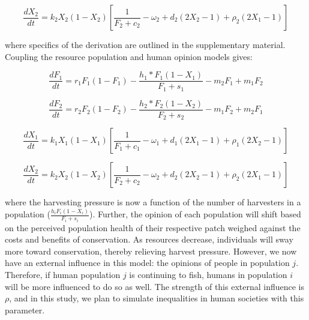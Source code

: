 \documentclass[
  12pt,
]{article}
\begin{document}
\begin{equation} 
\frac{dX_2}{dt} = k_2X_2(1-X_2)  [\frac{1}{F_2+c_2} - \omega_2 + d_2(2X_2 - 1) +  \rho_2(2X_1 - 1)]
  \label{eq:social2}
\end{equation}

where specifics of the derivation are outlined in the supplementary material. Coupling the resource population and human opinion models gives:

\begin{equation}
\frac{dF_1}{dt} = r_1F_1(1-F_1)-\frac{h_1*F_1(1-X_1)}{F_1 + s_1} -m_2F_1 + m_1F_2
  \label{eq:FishWhole1}
\end{equation}

\begin{equation}
\frac{dF_2}{dt} = r_2F_2(1-F_2)-\frac{h_2*F_2(1-X_2)}{F_2 + s_2} -m_1F_2 + m_2F_1
  \label{eq:FishWhole2}
\end{equation}

\begin{equation}
\frac{dX_1}{dt} =  k_1X_1(1-X_1) [\frac{1}{F_1+c_1} - \omega_1 + d_1(2X_1 - 1) + \rho_1(2X_2 - 1)]
  \label{eq:SocWhole1}
\end{equation}

\begin{equation}
\frac{dX_2}{dt} = k_2X_2(1-X_2)  [\frac{1}{F_2+c_2} - \omega_2 + d_2(2X_2 - 1) +  \rho_2(2X_1 - 1)]
  \label{eq:SocWhole2}
\end{equation}

where the harvesting pressure is now a function of the number of harvesters in a population (\(\frac{h_iF_i(1-X_i)}{F_i + s_i}\)). Further, the opinion of each population will shift based on the perceived population health of their respective patch weighed against the costs and benefits of conservation. As resources decrease, individuals will sway more toward conservation, thereby relieving harvest pressure. However, we now have an external influence in this model: the opinions of people in population \(j\). Therefore, if human population \(j\) is continuing to fish, humans in population \(i\) will be more influenced to do so as well. The strength of this external influence is \(\rho\), and in this study, we plan to simulate inequalities in human societies with this parameter.
\end{document}
